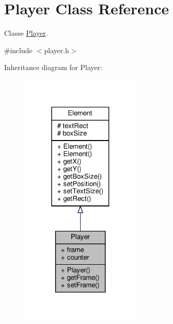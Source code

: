 \hypertarget{classPlayer}{}\section{Player Class Reference}
\label{classPlayer}


Classe \hyperlink{classPlayer}{Player}.  




{\ttfamily \#include $<$player.\+h$>$}



Inheritance diagram for Player\+:
\nopagebreak
\begin{figure}[H]
\begin{center}
\leavevmode
\includegraphics[width=164pt]{classPlayer__inherit__graph}
\end{center}
\end{figure}


